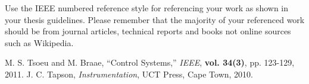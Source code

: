 Use the IEEE numbered reference style for referencing your work as shown in your thesis guidelines.
Please remember that the majority of your referenced work should be from journal articles, technical
reports and books not online sources such as Wikipedia.

\begin{thebibliography}{5}
 M. S. Tsoeu and M. Braae, ``Control Systems,'' \emph{IEEE}, {\bf vol. 34(3)}, pp. 123-129, 2011.
 J. C. Tapson, \emph{Instrumentation}, UCT Press, Cape Town, 2010.
\end{thebibliography}
